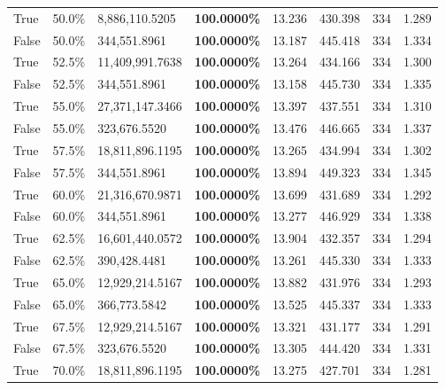 \begin{table}[H]
\begin{tabular}{lllrllll}
\cline{1-8}
True & 50.0\% & 8,886,110.5205 & \bfseries \color{red} 100.0000\% & 13.236 & 430.398 & 334 & 1.289 \\
\cline{1-8}
False & 50.0\% & 344,551.8961 & \bfseries \color{red} 100.0000\% & 13.187 & 445.418 & 334 & 1.334 \\
\cline{1-8}
True & 52.5\% & 11,409,991.7638 & \bfseries \color{red} 100.0000\% & 13.264 & 434.166 & 334 & 1.300 \\
\cline{1-8}
False & 52.5\% & 344,551.8961 & \bfseries \color{red} 100.0000\% & 13.158 & 445.730 & 334 & 1.335 \\
\cline{1-8}
True & 55.0\% & 27,371,147.3466 & \bfseries \color{red} 100.0000\% & 13.397 & 437.551 & 334 & 1.310 \\
\cline{1-8}
False & 55.0\% & 323,676.5520 & \bfseries \color{red} 100.0000\% & 13.476 & 446.665 & 334 & 1.337 \\
\cline{1-8}
True & 57.5\% & 18,811,896.1195 & \bfseries \color{red} 100.0000\% & 13.265 & 434.994 & 334 & 1.302 \\
\cline{1-8}
False & 57.5\% & 344,551.8961 & \bfseries \color{red} 100.0000\% & 13.894 & 449.323 & 334 & 1.345 \\
\cline{1-8}
True & 60.0\% & 21,316,670.9871 & \bfseries \color{red} 100.0000\% & 13.699 & 431.689 & 334 & 1.292 \\
\cline{1-8}
False & 60.0\% & 344,551.8961 & \bfseries \color{red} 100.0000\% & 13.277 & 446.929 & 334 & 1.338 \\
\cline{1-8}
True & 62.5\% & 16,601,440.0572 & \bfseries \color{red} 100.0000\% & 13.904 & 432.357 & 334 & 1.294 \\
\cline{1-8}
False & 62.5\% & 390,428.4481 & \bfseries \color{red} 100.0000\% & 13.261 & 445.330 & 334 & 1.333 \\
\cline{1-8}
True & 65.0\% & 12,929,214.5167 & \bfseries \color{red} 100.0000\% & 13.882 & 431.976 & 334 & 1.293 \\
\cline{1-8}
False & 65.0\% & 366,773.5842 & \bfseries \color{red} 100.0000\% & 13.525 & 445.337 & 334 & 1.333 \\
\cline{1-8}
True & 67.5\% & 12,929,214.5167 & \bfseries \color{red} 100.0000\% & 13.321 & 431.177 & 334 & 1.291 \\
\cline{1-8}
False & 67.5\% & 323,676.5520 & \bfseries \color{red} 100.0000\% & 13.305 & 444.420 & 334 & 1.331 \\
\cline{1-8}
True & 70.0\% & 18,811,896.1195 & \bfseries \color{red} 100.0000\% & 13.275 & 427.701 & 334 & 1.281 \\

\end{tabular}
\end{table}
